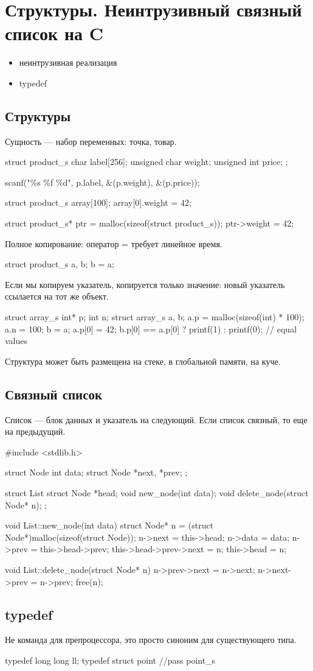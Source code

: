 % 
% 
\section{Структуры. Неинтрузивный связный список на C}
\begin{itemize}[noitemsep]
    \item неинтрузивная реализация
    \item typedef
\end{itemize}
\subsection{Структуры}
Сущность --- набор переменных: точка, товар.
\begin{ccode}
struct product_s {
    char label[256];
    unsigned char weight;
    unsigned int price;
};

scanf("\%s \%f \%d", p.label, &(p.weight), &(p.price));

struct product_s array[100];
array[0].weight = 42;

struct product_s* ptr = malloc(sizeof(struct product_s));
ptr->weight = 42;
\end{ccode}
Полное копирование: оператор = требует линейное время.
\begin{ccode}
struct product_s a, b;
b = a;
\end{ccode}
Если мы копируем указатель, копируется только значение: новый указатель ссылается на тот же объект.
\begin{ccode}
struct array_s {
    int* p;
    int n;
}
struct array_s a, b;
a.p = malloc(sizeof(int) * 100);
a.n = 100;
b = a;
a.p[0] = 42;
b.p[0] == a.p[0] ? printf(1) : printf(0); // equal values
\end{ccode}
Структура может быть размещена на стеке, в глобальной памяти, на куче.
\subsection{Связный список}
Список --- блок данных и указатель на следующий. Если список связный, то еще на предыдущий.
\begin{ccode}
#include <stdlib.h>

struct Node {
    int data;
    struct Node *next, *prev;
};

struct List {
    struct Node *head;
    void new_node(int data);
    void delete_node(struct Node* n);
};

void List::new_node(int data) {
    struct Node* n = (struct Node*)malloc(sizeof(struct Node));
    n->next = this->head;
    n->data = data;
    n->prev = this->head->prev;
    this->head->prev->next = n;
    this->head = n;
}

void List::delete_node(struct Node* n) {
    n->prev->next = n->next;
    n->next->prev = n->prev;
    free(n);
}
\end{ccode}
\subsection{typedef}
Не команда для препроцессора, это просто синоним для существующего типа.
\begin{ccode}
typedef long long ll;
typedef struct point {
    //pass
} point_s
\end{ccode}
% 
